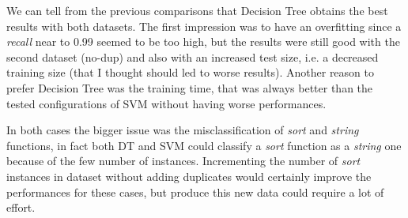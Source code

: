 \documentclass[11pt]{article}
\begin{document}
	We can tell from the previous comparisons that Decision Tree obtains the
	best results with both datasets. The first impression was to have an overfitting
	since a \textit{recall} near to 0.99 seemed to be too high, but the results were still
	good with the second dataset (no-dup) and also with an increased test size,
	i.e. a decreased training size (that I thought should led to worse results).
	Another reason to prefer Decision Tree was the training time, that was always
	better than the tested configurations of SVM without having worse performances.

	In both cases the bigger issue was the misclassification of \textit{sort}
	and \textit{string} functions, in fact both DT and SVM could classify a \textit{sort}
	function as a \textit{string} one because of the few number of instances.
	Incrementing the number of \textit{sort} instances in dataset without
	adding duplicates would certainly improve the performances for these cases,
	but produce this new data could require a lot of effort.
\end{document}
